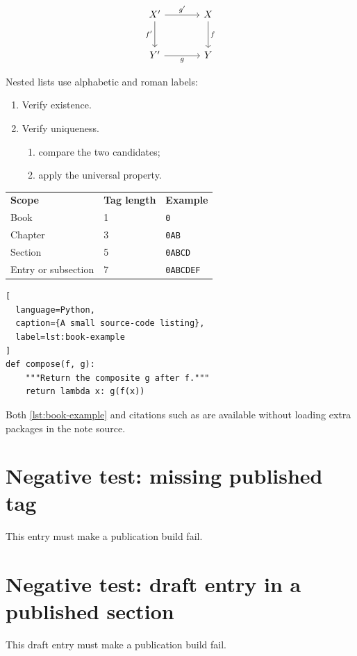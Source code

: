 \documentclass[sectionlevel=book,status=draft]{noteformyself}
\begin{document}
\[
\begin{tikzcd}[column sep=large,row sep=large]
  X' \arrow[r,"g'"] \arrow[d,"f'"'] & X \arrow[d,"f"] \\
  Y' \arrow[r,"g"'] & Y
\end{tikzcd}
\]

Nested lists use alphabetic and roman labels:
\begin{enumerate}
  \item Verify existence.
  \item Verify uniqueness.
    \begin{enumerate}
      \item compare the two candidates;
      \item apply the universal property.
    \end{enumerate}
\end{enumerate}

\begin{longtable}{@{}lll@{}}
  \textbf{Scope} & \textbf{Tag length} & \textbf{Example} \\
  Book & 1 & \texttt{0} \\
  Chapter & 3 & \texttt{0AB} \\
  Section & 5 & \texttt{0ABCD} \\
  Entry or subsection & 7 & \texttt{0ABCDEF}
\end{longtable}

\begin{lstlisting}[
  language=Python,
  caption={A small source-code listing},
  label=lst:book-example
]
def compose(f, g):
    """Return the composite g after f."""
    return lambda x: g(f(x))
\end{lstlisting}
Both \cref{lst:book-example} and citations such as \cite{hartshorne1977} are
available without loading extra packages in the note source.

\printbibliography[heading=bibintoc]

\ifdefined\NFMTestMissingTag
  \section[
    status=published,
    tag=0CDIJ,
    label=\labelNFM{sec:negative-missing-tag}
  ]{Negative test: missing published tag}
  \begin{theorem}[
    status=published,
    label=\labelNFM{thm:missing-published-tag}
  ]
    This entry must make a publication build fail.
  \end{theorem}
\fi

\ifdefined\NFMTestDraftInPublished
  \section[
    status=published,
    tag=0CDIJ,
    label=\labelNFM{sec:negative-draft-entry}
  ]{Negative test: draft entry in a published section}
  \begin{theorem}
    This draft entry must make a publication build fail.
  \end{theorem}
\fi
\end{document}
